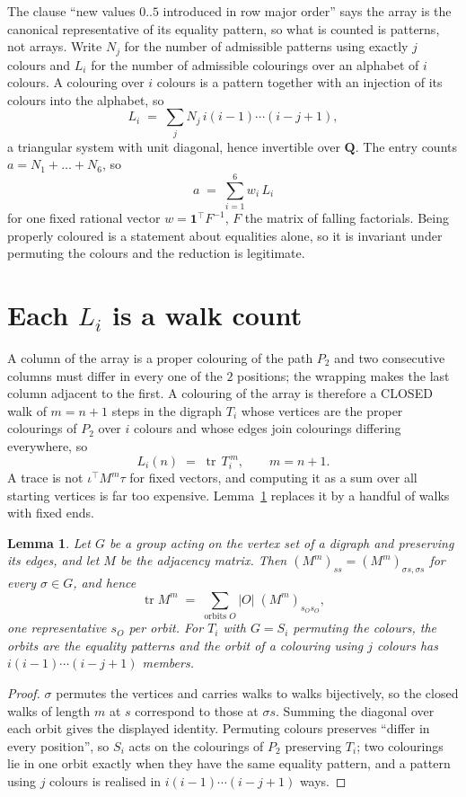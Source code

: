 \documentclass[11pt,a4paper]{article}
\theoremstyle{plain}
\newtheorem{lemma}[theorem]{Lemma}
\theoremstyle{definition}
\begin{document}
The clause ``new values $0..5$ introduced in row major order'' says the array is the
canonical representative of its equality pattern, so what is counted is patterns, not arrays.
Write $N_j$ for the number of admissible patterns using exactly $j$ colours and $L_i$ for the
number of admissible colourings over an alphabet of $i$ colours. A colouring over $i$ colours
is a pattern together with an injection of its colours into the alphabet, so
\[
L_i\;=\;\sum_j N_j\,i(i-1)\cdots(i-j+1),
\]
a triangular system with unit diagonal, hence invertible over $\mathbf{Q}$. The entry counts
$a=N_1+\dots+N_{6}$, so
\[
a\;=\;\sum_{i=1}^{6}w_i\,L_i
\]
for one fixed rational vector $w=\mathbf{1}^{\!\top}F^{-1}$, $F$ the matrix of falling
factorials. Being properly coloured is a statement about equalities alone, so it is invariant
under permuting the colours and the reduction is legitimate.

\section{Each $L_i$ is a walk count}

A column of the array is a proper colouring of the path $P_{2}$ and two consecutive
columns must differ in every one of the $2$ positions; the wrapping makes the last column
adjacent to the first. A colouring of the array is therefore a CLOSED walk of $m=n+1$ steps
in the digraph $T_i$ whose vertices are the proper colourings of $P_{2}$ over $i$ colours
and whose edges join colourings differing everywhere, so
\[
L_i(n)\;=\;\operatorname{tr}\,T_i^{\,m},\qquad m=n+1.
\]
A trace is not $\iota^{\!\top}M^m\tau$ for fixed vectors, and computing it as a sum over all
starting vertices is far too expensive. Lemma~\ref{lem:trace} replaces it by a handful of
walks with fixed ends.

\begin{lemma}\label{lem:trace}
Let $G$ be a group acting on the vertex set of a digraph and preserving its edges, and let $M$
be the adjacency matrix. Then $(M^m)_{ss}=(M^m)_{\sigma s,\sigma s}$ for every
$\sigma\in G$, and hence
\[
\operatorname{tr} M^m\;=\;\sum_{\text{orbits }O}|O|\;(M^m)_{s_O s_O} ,
\]
one representative $s_O$ per orbit. For $T_i$ with $G=S_i$ permuting the colours, the orbits
are the equality patterns and the orbit of a colouring using $j$ colours has
$i(i-1)\cdots(i-j+1)$ members.
\end{lemma}

\begin{proof}
$\sigma$ permutes the vertices and carries walks to walks bijectively, so the closed walks of
length $m$ at $s$ correspond to those at $\sigma s$. Summing the diagonal over each orbit
gives the displayed identity. Permuting colours preserves ``differ in every position'', so
$S_i$ acts on the colourings of $P_{2}$ preserving $T_i$; two colourings lie in one orbit
exactly when they have the same equality pattern, and a pattern using $j$ colours is realised
in $i(i-1)\cdots(i-j+1)$ ways.
\end{proof}
\end{document}
